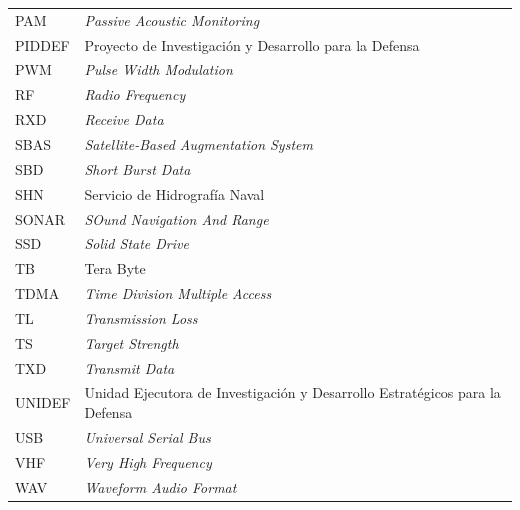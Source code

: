 \begin{tabular}{l p{12cm}}
  PAM		& \textit{Passive Acoustic Monitoring}\\  
  PIDDEF 	& Proyecto de Investigación y Desarrollo para la Defensa\\
  PWM		& \textit{Pulse Width Modulation}\\
  RF		& \textit{Radio Frequency}\\
  RXD		& \textit{Receive Data}\\
  SBAS		& \textit{Satellite-Based Augmentation System}\\	   
  SBD		& \textit{Short Burst Data}\\	  
  SHN 		& Servicio de Hidrografía Naval\\
  SONAR 	& \textit{SOund Navigation And Range}\\
  SSD		& \textit{Solid State Drive}\\  
  TB		& Tera Byte\\  
  TDMA		& \textit{Time Division Multiple Access}\\   
  TL 		& \textit{Transmission Loss}\\
  TS 		& \textit{Target Strength}\\ 
  TXD		& \textit{Transmit Data}\\
  UNIDEF 	& Unidad Ejecutora de Investigación y Desarrollo Estratégicos para la Defensa\\
  USB		& \textit{Universal Serial Bus}\\
  VHF		& \textit{Very High Frequency}\\
  WAV		& \textit{Waveform Audio Format}\\
 \end{tabular}

\clearpage
